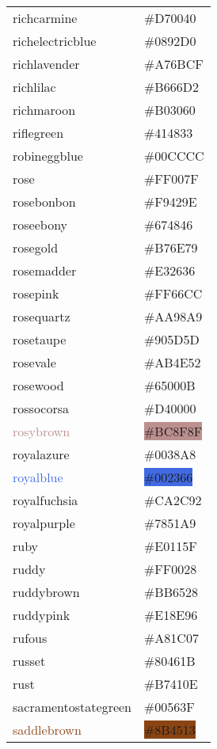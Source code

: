 \documentclass[
]{article}
\begin{document}
\begin{longtable}[]{@{}ll@{}}
\textcolor{richcarmine}{richcarmine} &
\colorbox{richcarmine}{\#D70040}\tabularnewline
\textcolor{richelectricblue}{richelectricblue} &
\colorbox{richelectricblue}{\#0892D0}\tabularnewline
\textcolor{richlavender}{richlavender} &
\colorbox{richlavender}{\#A76BCF}\tabularnewline
\textcolor{richlilac}{richlilac} &
\colorbox{richlilac}{\#B666D2}\tabularnewline
\textcolor{richmaroon}{richmaroon} &
\colorbox{richmaroon}{\#B03060}\tabularnewline
\textcolor{riflegreen}{riflegreen} &
\colorbox{riflegreen}{\#414833}\tabularnewline
\textcolor{robineggblue}{robineggblue} &
\colorbox{robineggblue}{\#00CCCC}\tabularnewline
\textcolor{rose}{rose} & \colorbox{brightpink}{\#FF007F}\tabularnewline
\textcolor{rosebonbon}{rosebonbon} &
\colorbox{rosebonbon}{\#F9429E}\tabularnewline
\textcolor{roseebony}{roseebony} &
\colorbox{roseebony}{\#674846}\tabularnewline
\textcolor{rosegold}{rosegold} &
\colorbox{rosegold}{\#B76E79}\tabularnewline
\textcolor{rosemadder}{rosemadder} &
\colorbox{alizarin}{\#E32636}\tabularnewline
\textcolor{rosepink}{rosepink} &
\colorbox{rosepink}{\#FF66CC}\tabularnewline
\textcolor{rosequartz}{rosequartz} &
\colorbox{rosequartz}{\#AA98A9}\tabularnewline
\textcolor{rosetaupe}{rosetaupe} &
\colorbox{rosetaupe}{\#905D5D}\tabularnewline
\textcolor{rosevale}{rosevale} &
\colorbox{redwood}{\#AB4E52}\tabularnewline
\textcolor{rosewood}{rosewood} &
\colorbox{rosewood}{\#65000B}\tabularnewline
\textcolor{rossocorsa}{rossocorsa} &
\colorbox{rossocorsa}{\#D40000}\tabularnewline
\textcolor{rosybrown}{rosybrown} &
\colorbox{rosybrown}{\#BC8F8F}\tabularnewline
\textcolor{royalazure}{royalazure} &
\colorbox{royalazure}{\#0038A8}\tabularnewline
\textcolor{royalblue}{royalblue} &
\colorbox{royalblue}{\#002366}\tabularnewline
\textcolor{royalfuchsia}{royalfuchsia} &
\colorbox{royalfuchsia}{\#CA2C92}\tabularnewline
\textcolor{royalpurple}{royalpurple} &
\colorbox{royalpurple}{\#7851A9}\tabularnewline
\textcolor{ruby}{ruby} & \colorbox{ruby}{\#E0115F}\tabularnewline
\textcolor{ruddy}{ruddy} & \colorbox{ruddy}{\#FF0028}\tabularnewline
\textcolor{ruddybrown}{ruddybrown} &
\colorbox{ruddybrown}{\#BB6528}\tabularnewline
\textcolor{ruddypink}{ruddypink} &
\colorbox{ruddypink}{\#E18E96}\tabularnewline
\textcolor{rufous}{rufous} & \colorbox{rufous}{\#A81C07}\tabularnewline
\textcolor{russet}{russet} & \colorbox{russet}{\#80461B}\tabularnewline
\textcolor{rust}{rust} & \colorbox{rust}{\#B7410E}\tabularnewline
\textcolor{sacramentostategreen}{sacramentostategreen} &
\colorbox{sacramentostategreen}{\#00563F}\tabularnewline
\textcolor{saddlebrown}{saddlebrown} &
\colorbox{saddlebrown}{\#8B4513}\tabularnewline

\end{longtable}
\end{document}
